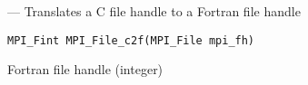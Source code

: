 \startmanpage
{}
--- Translates a C file handle to a Fortran file handle 
\startvb\begin{verbatim}
MPI_Fint MPI_File_c2f(MPI_File mpi_fh)

\end{verbatim}
\endvb

\par
{}
Fortran file handle (integer)
\endmanpage
